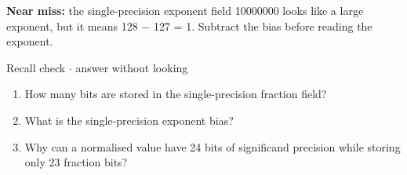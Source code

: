 \documentclass[11pt]{article}
\begin{document}
\begin{keepsection}
\begin{keepsection}
\begin{notebox}\textbf{Near miss:} the single-precision exponent field 10000000 looks like a large exponent, but it means 128 \ensuremath{-} 127 = 1. Subtract the bias before reading the exponent.\end{notebox}

\begin{recallbox}{Recall check \ensuremath{\cdot} answer without looking}
\begin{enumerate}
\item How many bits are stored in the single-precision fraction field?
\item What is the single-precision exponent bias?
\item Why can a normalised value have 24 bits of significand precision while storing only 23 fraction bits?
\end{enumerate}

\end{recallbox}
\end{keepsection}
\end{keepsection}
\end{document}
